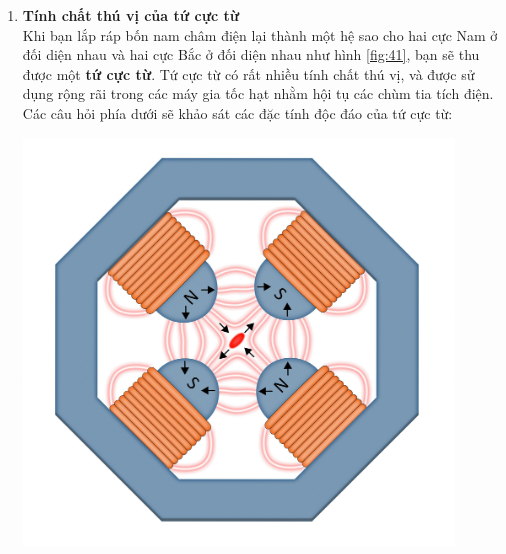 \begin{enumerate}
    \item \textbf{Tính chất thú vị của tứ cực từ} \\
    Khi bạn lắp ráp bốn nam châm điện lại thành một hệ sao cho hai cực Nam ở đối diện nhau và hai cực Bắc ở đối diện nhau như hình \ref{fig:41}, bạn sẽ thu được một \textbf{tứ cực từ}. Tứ cực từ có rất nhiều tính chất thú vị, và được sử dụng rộng rãi trong các máy gia tốc hạt nhằm hội tụ các chùm tia tích điện. Các câu hỏi phía dưới sẽ khảo sát các đặc tính độc đáo của tứ cực từ:
    
    \begin{center}
    \begin{minipage}{0.45\textwidth}
    \includegraphics[width=0.9\textwidth]{Problem_4/quadrupoles.png}
    \end{minipage}
    \begin{minipage}{0.45\textwidth}
    \centering
    \scalebox{0.5}{
    \begin{tikzpicture}[x=0.75pt,y=0.75pt,yscale=-1,xscale=1]
        

\end{tikzpicture}}
\end{minipage}
\end{center}
\end{enumerate}
